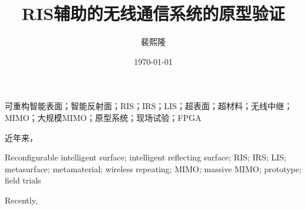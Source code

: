 \documentclass[supercite]{HustGraduPaper}
\title{RIS辅助的无线通信系统的原型验证} %
\author{裴熙隆} %
\date{\today} %
\begin{document}
	\maketitle
	
	\statement[confidentiality = false]
	
	\clearpage %
	
	\begin{cnabstract}{可重构智能表面；智能反射面；RIS；IRS；LIS；超表面；超材料；无线中继；MIMO；大规模MIMO；原型系统；现场试验；FPGA}
		
		近年来，
		
	\end{cnabstract}
	\begin{enabstract}{Reconfigurable intelligent surface; intelligent reflecting surface; RIS; IRS; LIS; metasurface; metamaterial; wireless repeating; MIMO; massive MIMO; prototype; field trials}

		Recently, 

	\end{enabstract}
	
	\tableofcontents
	
\end{document}
